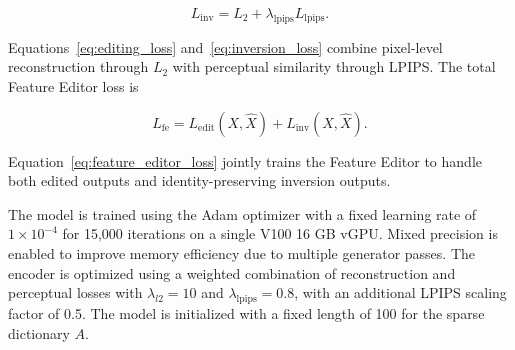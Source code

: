 \begin{equation}
    L_{\mathrm{inv}} = L_2 + \lambda_{\mathrm{lpips}} L_{\mathrm{lpips}}.
    \label{eq:inversion_loss}
\end{equation}

Equations~\eqref{eq:editing_loss} and~\eqref{eq:inversion_loss} combine pixel-level reconstruction through $L_2$ with perceptual similarity through LPIPS. The total Feature Editor loss is

\begin{equation}
    L_{\mathrm{fe}} = L_{\mathrm{edit}}(X, \hat{X}) + L_{\mathrm{inv}}(X, \hat{X}).
    \label{eq:feature_editor_loss}
\end{equation}

Equation~\eqref{eq:feature_editor_loss} jointly trains the Feature Editor to handle both edited outputs and identity-preserving inversion outputs.

The model is trained using the Adam optimizer with a fixed learning rate of $1 \times 10^{-4}$ for 15,000 iterations on a single V100 16 GB vGPU. Mixed precision is enabled to improve memory efficiency due to multiple generator passes. The encoder is optimized using a weighted combination of reconstruction and perceptual losses with $\lambda_{l2}=10$ and $\lambda_{\mathrm{lpips}}=0.8$, with an additional LPIPS scaling factor of 0.5. The model is initialized with a fixed length of 100 for the sparse dictionary $A$.
